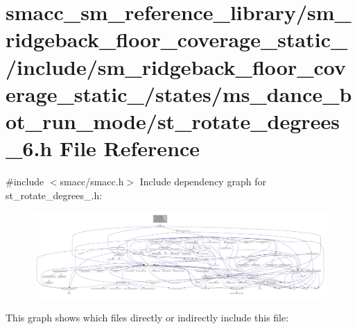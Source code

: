 \hypertarget{sm__ridgeback__floor__coverage__static__1_2include_2sm__ridgeback__floor__coverage__static__1_2s4a5906fd97cbaecb34834ca8bc335984}{}\section{smacc\+\_\+sm\+\_\+reference\+\_\+library/sm\+\_\+ridgeback\+\_\+floor\+\_\+coverage\+\_\+static\+\_/include/sm\+\_\+ridgeback\+\_\+floor\+\_\+coverage\+\_\+static\+\_/states/ms\+\_\+dance\+\_\+bot\+\_\+run\+\_\+mode/st\+\_\+rotate\+\_\+degrees\+\_\+6.h File Reference}
\label{sm__ridgeback__floor__coverage__static__1_2include_2sm__ridgeback__floor__coverage__static__1_2s4a5906fd97cbaecb34834ca8bc335984}
{\ttfamily \#include $<$smacc/smacc.\+h$>$}\newline
Include dependency graph for st\+\_\+rotate\+\_\+degrees\+\_.\+h\+:
\nopagebreak
\begin{figure}[H]
\begin{center}
\leavevmode
\includegraphics[width=350pt]{sm__ridgeback__floor__coverage__static__1_2include_2sm__ridgeback__floor__coverage__static__1_2s5c63f5279f9bd5f3f658c17f37110b6a}
\end{center}
\end{figure}
This graph shows which files directly or indirectly include this file\+:
\nopagebreak
